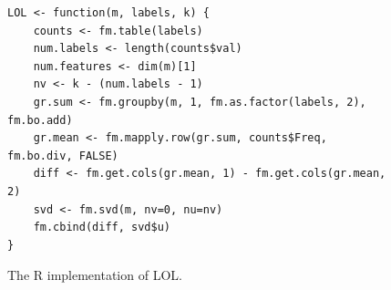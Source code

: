 \documentclass[10pt]{article}
\begin{document}
\clearpage
\begin{figure}[t]
\begin{lstlisting}
LOL <- function(m, labels, k) {
	counts <- fm.table(labels)
	num.labels <- length(counts$val)
	num.features <- dim(m)[1]
	nv <- k - (num.labels - 1)
	gr.sum <- fm.groupby(m, 1, fm.as.factor(labels, 2), fm.bo.add)
	gr.mean <- fm.mapply.row(gr.sum, counts$Freq, fm.bo.div, FALSE)
	diff <- fm.get.cols(gr.mean, 1) - fm.get.cols(gr.mean, 2)
	svd <- fm.svd(m, nv=0, nu=nv)
	fm.cbind(diff, svd$u)
}
\end{lstlisting}
\caption{The R implementation of LOL.}
\label{Rimpl}
\end{figure}






\clearpage
% 


\end{document}
